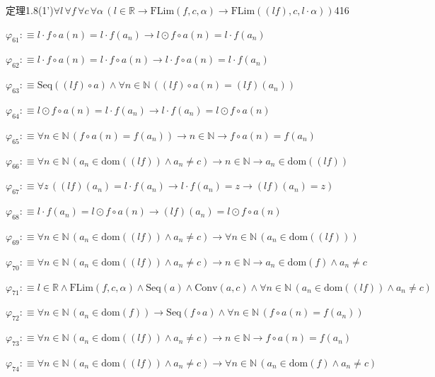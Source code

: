 \begin{fullproof}{定理1.8(1')}{$\forall l\,\forall f\,\forall c\,\forall \alpha\,(l \in \mathbb{R} \to \mathrm{FLim}(f,c,\alpha) \to \mathrm{FLim}((l f),c,l \cdot \alpha))$}{416}
\begin{abbrevlist}
\item $\varphi_{61} :\equiv l \cdot f \circ a(n) = l \cdot f(a_{n}) \to l \odot f \circ a(n) = l \cdot f(a_{n})$
\item $\varphi_{62} :\equiv l \cdot f \circ a(n) = l \cdot f \circ a(n) \to l \cdot f \circ a(n) = l \cdot f(a_{n})$
\item $\varphi_{63} :\equiv \mathrm{Seq}((l f) \circ a) \land \forall n \in \mathbb{N}\,((l f) \circ a(n) = (l f)(a_{n}))$
\item $\varphi_{64} :\equiv l \odot f \circ a(n) = l \cdot f(a_{n}) \to l \cdot f(a_{n}) = l \odot f \circ a(n)$
\item $\varphi_{65} :\equiv \forall n \in \mathbb{N}\,(f \circ a(n) = f(a_{n})) \to n \in \mathbb{N} \to f \circ a(n) = f(a_{n})$
\item $\varphi_{66} :\equiv \forall n \in \mathbb{N}\,(a_{n} \in \mathrm{dom}((l f)) \land a_{n} \neq c) \to n \in \mathbb{N} \to a_{n} \in \mathrm{dom}((l f))$
\item $\varphi_{67} :\equiv \forall z\,((l f)(a_{n}) = l \cdot f(a_{n}) \to l \cdot f(a_{n}) = z \to (l f)(a_{n}) = z)$
\item $\varphi_{68} :\equiv l \cdot f(a_{n}) = l \odot f \circ a(n) \to (l f)(a_{n}) = l \odot f \circ a(n)$
\item $\varphi_{69} :\equiv \forall n \in \mathbb{N}\,(a_{n} \in \mathrm{dom}((l f)) \land a_{n} \neq c) \to \forall n \in \mathbb{N}\,(a_{n} \in \mathrm{dom}((l f)))$
\item $\varphi_{70} :\equiv \forall n \in \mathbb{N}\,(a_{n} \in \mathrm{dom}((l f)) \land a_{n} \neq c) \to n \in \mathbb{N} \to a_{n} \in \mathrm{dom}(f) \land a_{n} \neq c$
\item $\varphi_{71} :\equiv l \in \mathbb{R} \land \mathrm{FLim}(f,c,\alpha) \land \mathrm{Seq}(a) \land \mathrm{Conv}(a,c) \land \forall n \in \mathbb{N}\,(a_{n} \in \mathrm{dom}((l f)) \land a_{n} \neq c)$
\item $\varphi_{72} :\equiv \forall n \in \mathbb{N}\,(a_{n} \in \mathrm{dom}(f)) \to \mathrm{Seq}(f \circ a) \land \forall n \in \mathbb{N}\,(f \circ a(n) = f(a_{n}))$
\item $\varphi_{73} :\equiv \forall n \in \mathbb{N}\,(a_{n} \in \mathrm{dom}((l f)) \land a_{n} \neq c) \to n \in \mathbb{N} \to f \circ a(n) = f(a_{n})$
\item $\varphi_{74} :\equiv \forall n \in \mathbb{N}\,(a_{n} \in \mathrm{dom}((l f)) \land a_{n} \neq c) \to \forall n \in \mathbb{N}\,(a_{n} \in \mathrm{dom}(f) \land a_{n} \neq c)$

\end{abbrevlist}
\end{fullproof}
